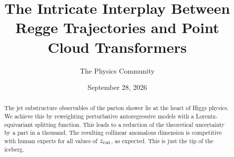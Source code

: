 \documentclass[11pt]{article}
\title{The Intricate Interplay Between Regge Trajectories and Point Cloud Transformers}
\author{The Physics Community}
\date{September 28, 2026}
\numberwithin{equation}{section}
\theoremstyle{definition}
\theoremstyle{remark}
\begin{document}
\maketitle
\begin{abstract}
The jet substructure observables of the parton shower lie at the heart
of Higgs physics. We achieve this by reweighting perturbative
autoregressive models with a Lorentz-equivariant splitting function.
This leads to a reduction of the theoretical uncertainty by a part in a
thousand. The resulting collinear anomalous dimension is competitive
with human experts for all values of $z_{\rm cut}$, as expected. This is
just the tip of the iceberg.
\end{abstract}
\tableofcontents





\nocite{*}


\end{document}
